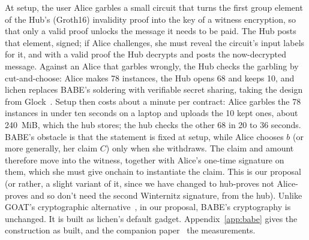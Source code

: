 \documentclass[11pt]{article}
\begin{document}
At setup, the user Alice
garbles a small circuit that turns the first group element of the Hub's (Groth16) invalidity proof
into the key of a witness encryption, so that only a valid proof unlocks
the message it needs to be paid. The Hub posts that element, signed; if
Alice challenges, she must reveal the circuit's input labels for it,
and with a valid proof the Hub decrypts and posts the now-decrypted message. Against an
Alice that garbles wrongly, the Hub checks the garbling by cut-and-choose: Alice makes 78 instances, the Hub opens 68 and keeps 10, and lichen replaces BABE's soldering with verifiable secret sharing, taking the design from Glock~\cite{glock}. Setup then costs about a minute per contract: Alice garbles the 78 instances in under ten seconds on a laptop and uploads the 10 kept ones, about 240~MiB, which the hub stores; the hub checks the other 68 in 20 to 36 seconds. BABE's obstacle is
that the statement is fixed at setup, while Alice chooses $b$ (or more generally, her claim $C$) only when
she withdraws. The claim and amount therefore move into the witness, together with
Alice's one-time signature on them, which she must give onchain to instantiate the claim. This is our
proposal~\cite{delving} (or rather, a slight variant of it, since we have changed to hub-proves not Alice-proves and so don't need the second Winternitz signature, from the hub). Unlike GOAT's cryptographic
alternative~\cite{goat}, in our proposal, BABE's cryptography is
unchanged. It is built as lichen's default gadget.
Appendix~\ref{app:babe} gives the construction as built, and the
companion paper~\cite{lichenl2} the measurements.
\end{document}
